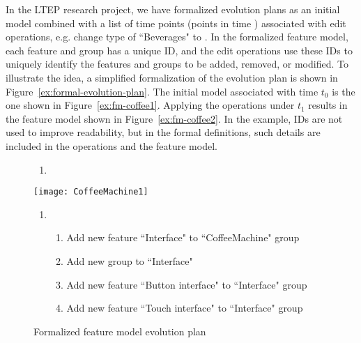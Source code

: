 
In the LTEP research project, we have formalized evolution plans as an initial model combined with a list of time points (points in time ) associated with edit operations, e.g. change type of ``Beverages" to \optional{}. In the formalized feature model, each feature and group has a unique ID, and the edit operations use these IDs to uniquely identify the features and groups to be added, removed, or modified. To illustrate the idea, a simplified formalization of the evolution plan is shown in Figure~\vref{ex:formal-evolution-plan}. The initial model associated with time $t_0$ is the one shown in Figure~\vref{ex:fm-coffee1}. Applying the operations under $t_1$ results in the feature model shown in Figure~\vref{ex:fm-coffee2}. In the example, IDs are not used to improve readability, but in the formal definitions, such details are included in the operations and the feature model. 

\begin{figure}
   \footnotesize
   \begin{center}
      \begin{minipage}{0.98\textwidth}
         \begin{enumerate}[{\small $t_0$}]
            \item 
         \end{enumerate}
      \end{minipage}
      \texttt{[image: CoffeeMachine1]}
      \bigskip

      \begin{minipage}{0.98\textwidth}
         \begin{enumerate}[{\small $t_1$}]
            \item 
               \begin{enumerate}[ ]
                  \item Add new \mandatory{} feature ``Interface" to ``CoffeeMachine" \andtype{} group
                  \item Add new \xortype{} group to ``Interface"
                  \item Add new feature ``Button interface" to ``Interface" \xortype{} group
                  \item Add new feature ``Touch interface"  to ``Interface" \xortype{} group               \end{enumerate}
         \end{enumerate}
      \end{minipage}
      \caption{Formalized feature model evolution plan}
      \label{ex:formal-evolution-plan}
   \end{center}
\end{figure}

